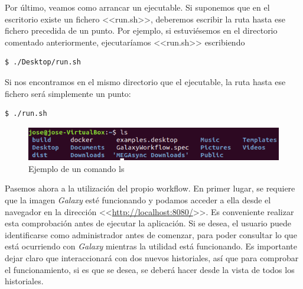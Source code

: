 Por último, veamos como arrancar un ejecutable. Si suponemos que en el escritorio existe un fichero <<run.sh>>, deberemos escribir la ruta hasta ese fichero precedida de un punto. Por ejemplo, si estuviésemos en el directorio comentado anteriormente, ejecutaríamos <<run.sh>> escribiendo
\begin{lstlisting}[language=bash]
    $ ./Desktop/run.sh
\end{lstlisting}
 Si nos encontramos en el mismo directorio que el ejecutable, la ruta hasta ese fichero será simplemente un punto: 
 \begin{lstlisting}[language=bash]
    $ ./run.sh
\end{lstlisting}

\begin{figure}[!ht]
    \begin{center}
      \includegraphics[scale=0.8]{images/ls.png}
      \caption{Ejemplo de un comando ls}
      \label{fig:ls}
    \end{center}
\end{figure}

Pasemos ahora a la utilización del propio workflow. En primer lugar, se requiere que la imagen \textit{Galaxy} esté funcionando y podamos acceder a ella desde el navegador en la dirección <<\url{http://localhost:8080/}>>. Es conveniente realizar esta comprobación antes de ejecutar la aplicación. Si se desea, el usuario puede identificarse como administrador antes de comenzar, para poder consultar lo que está ocurriendo con \textit{Galaxy} mientras la utilidad está funcionando. Es importante dejar claro que interaccionará con dos nuevos historiales, así que para comprobar el funcionamiento, si es que se desea, se deberá hacer desde la vista de todos los historiales.

